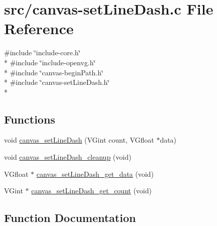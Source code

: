\hypertarget{canvas-setLineDash_8c}{}\section{src/canvas-\/set\+Line\+Dash.c File Reference}
\label{canvas-setLineDash_8c}
{\ttfamily \#include \char`\"{}include-\/core.\+h\char`\"{}}\\*
{\ttfamily \#include \char`\"{}include-\/openvg.\+h\char`\"{}}\\*
{\ttfamily \#include \char`\"{}canvas-\/begin\+Path.\+h\char`\"{}}\\*
{\ttfamily \#include \char`\"{}canvas-\/set\+Line\+Dash.\+h\char`\"{}}\\*
\subsection*{Functions}
\begin{DoxyCompactItemize}
\item 
void \hyperlink{canvas-setLineDash_8c_ad9a61343ebe550729606465767eadf8f}{canvas\+\_\+set\+Line\+Dash} (V\+Gint count, V\+Gfloat $\ast$data)
\item 
void \hyperlink{canvas-setLineDash_8c_ae54e972b2cf53e6178968d2b25a56d07}{canvas\+\_\+set\+Line\+Dash\+\_\+cleanup} (void)
\item 
V\+Gfloat $\ast$ \hyperlink{canvas-setLineDash_8c_af5a4ac39592594db4dc40f11c9ec3f9d}{canvas\+\_\+set\+Line\+Dash\+\_\+get\+\_\+data} (void)
\item 
V\+Gint $\ast$ \hyperlink{canvas-setLineDash_8c_aa5227653926a01d0dbb642439af89644}{canvas\+\_\+set\+Line\+Dash\+\_\+get\+\_\+count} (void)
\end{DoxyCompactItemize}


\subsection{Function Documentation}
\hypertarget{canvas-setLineDash_8c_ad9a61343ebe550729606465767eadf8f}{}
